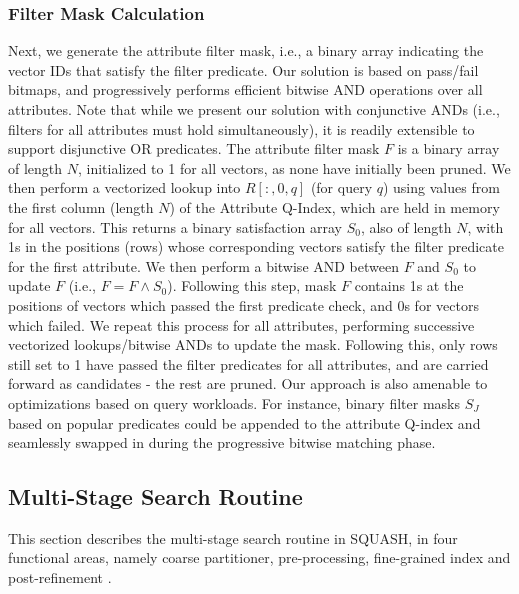 \subsubsection{Filter Mask Calculation}
Next, we generate the attribute filter mask, i.e., a binary array indicating the vector IDs that satisfy the filter predicate. Our solution is based on pass/fail bitmaps, and progressively performs efficient bitwise AND operations over all attributes. 
Note that while we present our solution with conjunctive ANDs (i.e., filters for all attributes must hold simultaneously), it is readily extensible to support disjunctive OR predicates.
The attribute filter mask $F$ is a binary array of length $N$, initialized to 1 for all vectors, as none have initially been pruned. We then perform a vectorized lookup into $R[:,0,q]$ (for query $q$) using values from the first column (length $N$) of the Attribute Q-Index, which are held in memory for all vectors. This returns a binary satisfaction array $S_0$, also of length $N$, with 1s in the positions (rows) whose corresponding vectors satisfy the filter predicate for the first attribute. We then perform a bitwise AND between $F$ and $S_0$ to update $F$ (i.e., $F = F \wedge S_0$). Following this step, mask $F$ contains 1s at the positions of vectors which passed the first predicate check, and 0s for vectors which failed. We repeat this process for all attributes, performing successive vectorized lookups/bitwise ANDs to update the mask. Following this, only rows still set to 1 have passed the filter predicates for all attributes, and are carried forward as candidates - the rest are pruned. 
Our approach is also amenable to optimizations based on query workloads. 
For instance, binary filter masks $S_J$ based on popular predicates could be appended to the attribute Q-index and seamlessly swapped in during the progressive bitwise matching phase. 




\subsection{Multi-Stage Search Routine}
\label{ss:2.4-search-pipeline}

This section describes the multi-stage search routine in SQUASH, in four functional areas, namely coarse partitioner, pre-processing, fine-grained index and post-refinement \cite{douze2024faisslibraryivfsq8}. 

